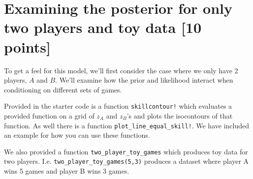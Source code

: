 \documentclass{article}
\begin{document}
\pagebreak

\section{Examining the posterior for only two players and toy data [10 points]}
To get a feel for this model, we'll first consider the case where we only have 2 players, $A$ and $B$.
We'll examine how the prior and likelihood interact when conditioning on different sets of games. 

Provided in the starter code is a function \texttt{skillcontour!} which evaluates a provided function on a grid of $z_A$ and $z_B$'s and plots the isocontours of that function.
As well there is a function \texttt{plot\_line\_equal\_skill!}. 
We have included an example for how you can use these functions.

We also provided a function \texttt{two\_player\_toy\_games} which produces toy data for two players.
I.e. \texttt{two\_player\_toy\_games(5,3)} produces a dataset where player A wins 5 games and player B wins 3 games.
\end{document}
